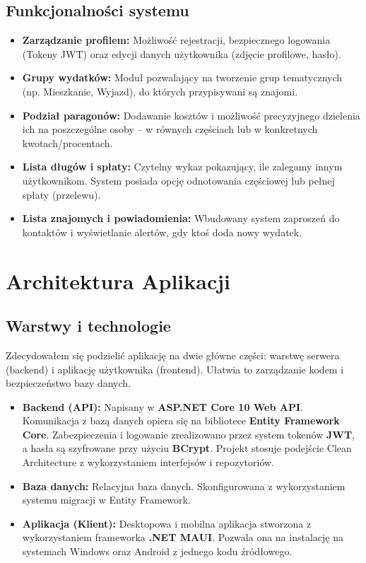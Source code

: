 \documentclass[12pt, a4paper]{article}
\begin{document}
\subsection{Funkcjonalności systemu}
\begin{itemize}
    \item \textbf{Zarządzanie profilem:} Możliwość rejestracji, bezpiecznego logowania (Tokeny JWT) oraz edycji danych użytkownika (zdjęcie profilowe, hasło).
    \item \textbf{Grupy wydatków:} Moduł pozwalający na tworzenie grup tematycznych (np. Mieszkanie, Wyjazd), do których przypisywani są znajomi.
    \item \textbf{Podział paragonów:} Dodawanie kosztów i możliwość precyzyjnego dzielenia ich na poszczególne osoby – w równych częściach lub w konkretnych kwotach/procentach.
    \item \textbf{Lista długów i spłaty:} Czytelny wykaz pokazujący, ile zalegamy innym użytkownikom. System posiada opcję odnotowania częściowej lub pełnej spłaty (przelewu).
    \item \textbf{Lista znajomych i powiadomienia:} Wbudowany system zaproszeń do kontaktów i wyświetlanie alertów, gdy ktoś doda nowy wydatek.
\end{itemize}

\section{Architektura Aplikacji}
\subsection{Warstwy i technologie}
Zdecydowałem się podzielić aplikację na dwie główne części: warstwę serwera (backend) i aplikację użytkownika (frontend). Ułatwia to zarządzanie kodem i bezpieczeństwo bazy danych.
\begin{itemize}
    \item \textbf{Backend (API):} Napisany w \textbf{ASP.NET Core 10 Web API}. Komunikacja z bazą danych opiera się na bibliotece \textbf{Entity Framework Core}. Zabezpieczenia i logowanie zrealizowano przez system tokenów \textbf{JWT}, a hasła są szyfrowane przy użyciu \textbf{BCrypt}. Projekt stosuje podejście Clean Architecture z wykorzystaniem interfejsów i repozytoriów.
    \item \textbf{Baza danych:} Relacyjna baza danych. Skonfigurowana z wykorzystaniem systemu migracji w Entity Framework.
    \item \textbf{Aplikacja (Klient):} Desktopowa i mobilna aplikacja stworzona z wykorzystaniem frameworka \textbf{.NET MAUI}. Pozwala ona na instalację na systemach Windows oraz Android z jednego kodu źródłowego.
\end{itemize}
\end{document}
